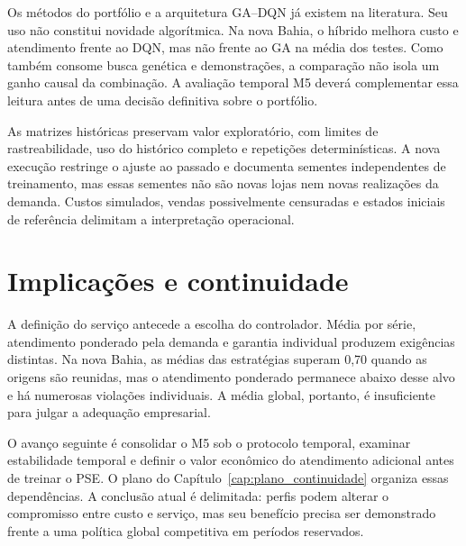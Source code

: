 Os métodos do portfólio e a arquitetura GA--DQN já existem na literatura. Seu uso não constitui novidade algorítmica. Na nova Bahia, o híbrido melhora custo e atendimento frente ao DQN, mas não frente ao GA na média dos testes. Como também consome busca genética e demonstrações, a comparação não isola um ganho causal da combinação. A avaliação temporal M5 deverá complementar essa leitura antes de uma decisão definitiva sobre o portfólio.

As matrizes históricas preservam valor exploratório, com limites de rastreabilidade, uso do histórico completo e repetições determinísticas. A nova execução restringe o ajuste ao passado e documenta sementes independentes de treinamento, mas essas sementes não são novas lojas nem novas realizações da demanda. Custos simulados, vendas possivelmente censuradas e estados iniciais de referência delimitam a interpretação operacional.

\section{Implicações e continuidade}

A definição do serviço antecede a escolha do controlador. Média por série, atendimento ponderado pela demanda e garantia individual produzem exigências distintas. Na nova Bahia, as médias das estratégias superam 0,70 quando as origens são reunidas, mas o atendimento ponderado permanece abaixo desse alvo e há numerosas violações individuais. A média global, portanto, é insuficiente para julgar a adequação empresarial.

O avanço seguinte é consolidar o M5 sob o protocolo temporal, examinar estabilidade temporal e definir o valor econômico do atendimento adicional antes de treinar o PSE. O plano do Capítulo~\ref{cap:plano_continuidade} organiza essas dependências. A conclusão atual é delimitada: perfis podem alterar o compromisso entre custo e serviço, mas seu benefício precisa ser demonstrado frente a uma política global competitiva em períodos reservados.
